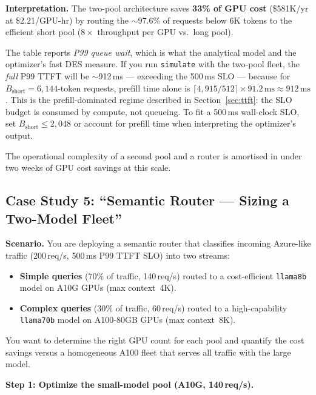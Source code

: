 \documentclass[11pt,a4paper]{article}
\newcommand{\Bshort}{B_{\text{short}}}
\begin{document}
\textbf{Interpretation.}  The two-pool architecture saves
\textbf{33\% of GPU cost} (\$581K/yr at \$2.21/GPU-hr) by routing
the $\sim$97.6\% of requests below 6K tokens to the efficient
short pool ($8\times$ throughput per GPU vs.\ long pool).

\begin{warning}
  The table reports \emph{P99 queue wait}, which is what the
  analytical model and the optimizer's fast DES measure.  If you
  run \texttt{simulate} with the two-pool fleet, the \emph{full}
  P99 TTFT will be $\sim$912\,ms --- exceeding the 500\,ms SLO ---
  because for $\Bshort = 6{,}144$-token requests, prefill time
  alone is $\lceil 4{,}915/512 \rceil \times 91.2\,\text{ms}
  \approx 912\,\text{ms}$.  This is the prefill-dominated regime
  described in Section~\ref{sec:ttft}: the SLO budget is consumed
  by compute, not queueing.  To fit a 500\,ms wall-clock SLO, set
  $\Bshort \leq 2{,}048$ or account for prefill time when
  interpreting the optimizer's output.
\end{warning}

The operational complexity of a second pool and a router is
amortised in under two weeks of GPU cost savings at this scale.

\subsection{Case Study 5: ``Semantic Router --- Sizing a Two-Model Fleet''}
\label{sec:cs-semantic}

\textbf{Scenario.}  You are deploying a semantic router that classifies
incoming Azure-like traffic (200\,req/s, 500\,ms P99 TTFT SLO) into two
streams:

\begin{itemize}[nosep]
  \item \textbf{Simple queries} (70\% of traffic, 140\,req/s) routed to a
    cost-efficient \texttt{llama8b} model on A10G GPUs (max context~4K).
  \item \textbf{Complex queries} (30\% of traffic, 60\,req/s) routed to a
    high-capability \texttt{llama70b} model on A100-80GB GPUs (max context~8K).
\end{itemize}

You want to determine the right GPU count for each pool and quantify the
cost savings versus a homogeneous A100 fleet that serves all traffic with
the large model.

\textbf{Step 1: Optimize the small-model pool (A10G, 140\,req/s).}
\end{document}
